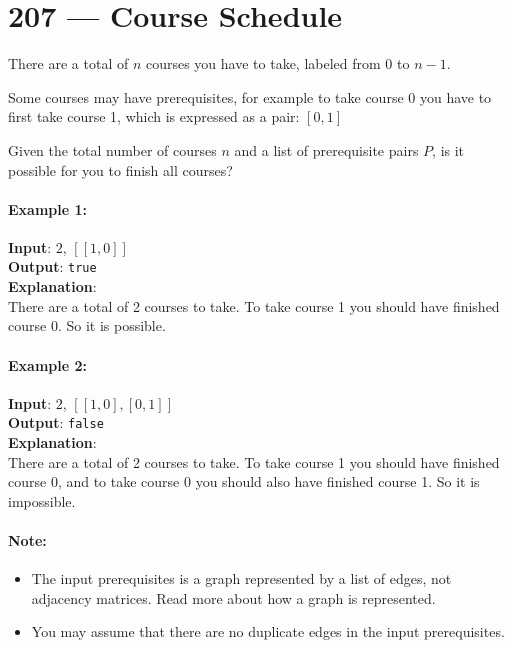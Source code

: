 \section{207 --- Course Schedule}
There are a total of $n$ courses you have to take, labeled from 0 to $n-1$.
\par
Some courses may have prerequisites, for example to take course 0 you have to first take course 1, which is expressed as a pair: $[0,1]$
\par
Given the total number of courses $n$ and a list of prerequisite pairs $P$, is it possible for you to finish all courses?
\paragraph{Example 1:}
\begin{flushleft}
\textbf{Input}: $2$, $[[1,0]]$
\\
\textbf{Output}: \texttt{true}
\\
\textbf{Explanation}:
\\
There are a total of 2 courses to take. To take course 1 you should have finished course 0. So it is possible.
\end{flushleft}
\paragraph{Example 2:}
\begin{flushleft}
\textbf{Input}: $2$, $[[1,0],[0,1]]$
\\
\textbf{Output}: \texttt{false}
\\
\textbf{Explanation}:
\\
There are a total of 2 courses to take. To take course 1 you should have finished course 0, and to take course 0 you should also have finished course 1. So it is impossible.
\end{flushleft}
\paragraph{Note:}
\begin{itemize}
    \item The input prerequisites is a graph represented by a list of edges, not adjacency matrices. Read more about how a graph is represented.
    \item You may assume that there are no duplicate edges in the input prerequisites.
\end{itemize}

